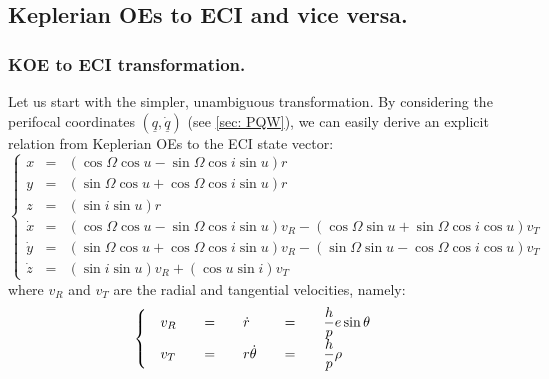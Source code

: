 	\subsection{Keplerian OEs to ECI and vice versa.}
		\subsubsection{KOE to ECI transformation.}
		\indent Let us start with the simpler, unambiguous transformation. By considering the perifocal coordinates $\left(\underline{q}, \dot{\underline{q}}\right) $ (see \ref{sec: PQW}), we can easily derive an explicit relation from Keplerian OEs to the ECI state vector:
		\[\left\{ \begin{array}{lll}
		x 		& = &\left(\cos\Omega \cos u - \sin \Omega \cos i \sin u\right) r \\
		y 		& = & \left(\sin\Omega \cos u + \cos \Omega \cos i \sin u\right) r \\
		z 		& = & \left(\sin i \sin u\right) r \\
		\dot{x} & = & \left(\cos\Omega \cos u - \sin \Omega \cos i \sin u\right) v_R  - \left(\cos\Omega \sin u + \sin \Omega \cos i \cos u\right) v_T \\
		\dot{y} & = & \left(\sin\Omega \cos u + \cos \Omega \cos i \sin u\right) v_R  - \left(\sin\Omega \sin u - \cos \Omega \cos i \cos u\right) v_T \\
		\dot{z} & = & \left(\sin i \sin u \right) v_R + \left(\cos u \sin i \right) v_T
		\end{array}\right.
		\]
		\noindent where $v_R$ and $v_T$ are the radial and tangential velocities, namely:
		\[
		\arraycolsep=10pt
		\def\arraystretch{1.3}
		\left\{ \begin{array}{lllll}
		v_R & = & \dot{r} & = & \dfrac{h}{p} e \sin \theta \\
		v_T & = &  r \dot{\theta} & = & \dfrac{h}{p} \rho
		\end{array}\right.
		\]
